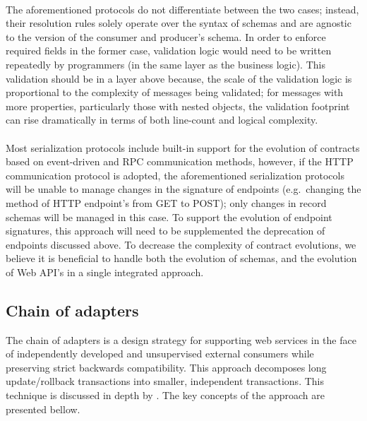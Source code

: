 \paragraph{}

The aforementioned protocols do not differentiate between the two cases; instead, their resolution rules solely operate over the syntax of schemas and are agnostic to the version of the consumer and producer's schema.
In order to enforce required fields in the former case,
validation logic would need to be written repeatedly by programmers (in the same layer as the business logic).
This validation should be in a layer above because, the scale of the validation logic is proportional to the complexity of messages being validated;
for messages with more properties, particularly those with nested objects, the validation footprint can rise dramatically in terms of both line-count and logical complexity.

\paragraph{}

Most serialization protocols include built-in support for the evolution of contracts based on event-driven and RPC communication methods,
however, if the HTTP communication protocol is adopted, the aforementioned serialization protocols will be unable to manage changes in the signature of endpoints
(e.g.\ changing the method of HTTP endpoint's from GET to POST); only changes in record schemas will be managed in this case.
To support the evolution of endpoint signatures, this approach will need to be supplemented the deprecation of endpoints discussed above.
To decrease the complexity of contract evolutions, we believe it is beneficial to handle both the evolution of schemas, and the evolution of Web API's in a single integrated approach.

\subsection{Chain of adapters} %
\label{sec:chain_of_adapters}

The chain of adapters is a design strategy for supporting web services in the face of independently developed and unsupervised external consumers while preserving strict backwards compatibility.
This approach decomposes long update/rollback transactions into smaller, independent transactions.
This technique is discussed in depth by \citeauthor{13} \cite{13}.
The key concepts of the approach are presented bellow.

